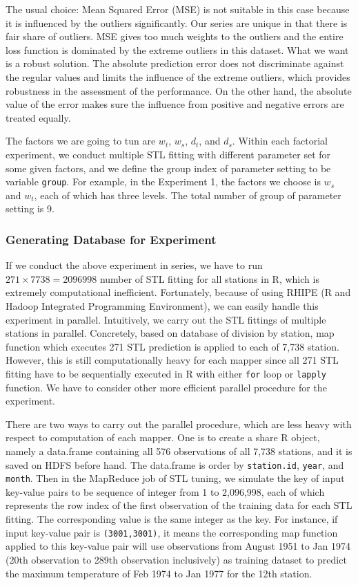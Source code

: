 The usual choice: Mean Squared Error (MSE) is not suitable in this case because 
it is influenced by the outliers significantly. Our series are unique in that 
there is fair share of outliers. MSE gives too much weights to the outliers and 
the entire loss function is dominated by the extreme outliers in this dataset. 
What we want is a robust solution. The absolute prediction error does 
not discriminate against the regular values and limits the influence of the 
extreme outliers, which provides robustness in the assessment of the performance. 
On the other hand, the absolute value of the error makes sure the influence from 
positive and negative errors are treated equally.

The factors we are going to tun are $w_t$, $w_s$, $d_t$, 
and $d_s$. Within each factorial experiment, we conduct multiple STL fitting with 
different parameter set for some given factors, and we define the group index of 
parameter setting to be variable \texttt{group}. For example, in the Experiment 1,
the factors we choose is $w_s$ and $w_t$, each of which has three levels. The 
total number of group of parameter setting is 9.

\subsubsection{Generating Database for Experiment}
\label{sec:a1950.stlexp}

If we conduct the above experiment in series, we have to run 
$271 \times 7738 = 2096998$ number of STL fitting for all stations in R, which is 
extremely computational inefficient. Fortunately, because of using RHIPE
(R and Hadoop Integrated Programming Environment), we can easily handle this 
experiment in parallel. Intuitively, we carry out the STL fittings of multiple 
stations in parallel. Concretely, based on database of division by station, map
function which executes 271 STL prediction is applied to each of 7,738 station.
However, this is still computationally heavy for each mapper since all 271 STL 
fitting have to be sequentially executed in R with either \texttt{for} loop or 
\texttt{lapply} function. We have to consider other more efficient parallel 
procedure for the experiment.

There are two ways to carry out the parallel procedure, which are less 
heavy with respect to computation of each mapper. One is to create a share
R object, namely a data.frame containing all 576 observations of all 7,738 
stations, and it is saved on HDFS before hand. The data.frame is order by 
\texttt{station.id}, \texttt{year}, and \texttt{month}. Then in the MapReduce 
job of STL tuning, we simulate the key of input key-value pairs to be sequence 
of integer from 1 to 2,096,998, each of which represents the row index of the 
first observation of the training data for each STL fitting. The corresponding 
value is the same integer as the key. For instance, if input key-value pair is 
\texttt{(3001,3001)}, it means the corresponding map function applied to this 
key-value pair will use observations from August 1951 to Jan 1974 (20th observation
to 289th observation inclusively) as training dataset to predict the maximum 
temperature of Feb 1974 to Jan 1977 for the 12th station.


